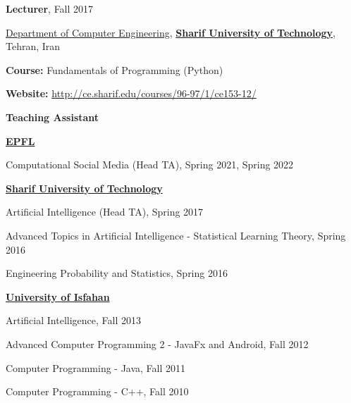 \documentclass[8pt]{article}
\newcommand{\makeheading}[2][]%
        {\hspace*{-\marginparsep minus \marginparwidth}%
         \begin{minipage}[t]{\textwidth+\marginparwidth+\marginparsep}%
             {\large \bfseries #2 \hfill #1}\\[-0.15\baselineskip]%
                 \rule{\columnwidth}{1pt}%
         \end{minipage}}
\newcommand{\halfblankline}{\quad\vspace{-0.5\baselineskip}\pagebreak[3]}
\begin{document}
\halfblankline


\textbf{Lecturer}, {Fall 2017}
\begin{innerlist}
	\item[] \href{http://ce.sharif.edu/}{Department of Computer Engineering}, \href{http://www.en.sharif.edu/}{\textbf{Sharif University of Technology}}, Tehran, Iran
	\begin{innerlist}
		\item[] \textbf{Course:} Fundamentals of Programming (Python)
		\item[] \textbf{Website:} \href{http://ce.sharif.edu/courses/96-97/1/ce153-12/}{http://ce.sharif.edu/courses/96-97/1/ce153-12/}
	\end{innerlist}
\end{innerlist}

\halfblankline

\textbf{Teaching Assistant}
\begin{innerlist}
	\item[] \href{http://www.en.sharif.edu/}{\textbf{EPFL}}
	\begin{innerlist}
		\item Computational Social Media (Head TA), Spring 2021, Spring 2022
	\end{innerlist}
	\item[] \href{http://www.en.sharif.edu/}{\textbf{Sharif University of Technology}}
	\begin{innerlist}
		\item Artificial Intelligence (Head TA), Spring 2017
		\item Advanced Topics in Artificial Intelligence - Statistical Learning Theory, Spring 2016
		\item Engineering Probability and Statistics, Spring 2016
	\end{innerlist}
	\href{http://ui.ac.ir/EN}{\textbf{University of Isfahan}}
	\begin{innerlist}
		\item Artificial Intelligence, Fall 2013
		\item Advanced Computer Programming 2 - JavaFx and Android, {Fall 2012}
		\item Computer Programming - Java, Fall 2011
		\item Computer Programming - C++, Fall 2010
	\end{innerlist}
\end{innerlist}

\end{document}
